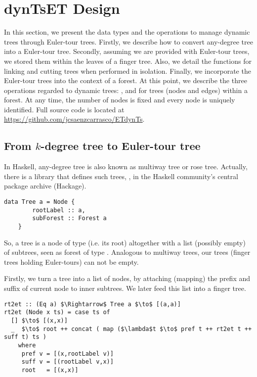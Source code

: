 \section{dynTsET Design}
\label{sec:TechDes}  


In this section, we present the data types and the operations to manage dynamic trees through Euler-tour trees. Firstly, we describe how to convert any-degree tree into a Euler-tour tree. Secondly, assuming we are provided with Euler-tour trees, we stored them within the leaves of a finger tree. Also, we detail the functions for linking and cutting trees when performed in isolation. Finally, we incorporate the Euler-tour trees into the context of a forest. At this point, we describe the three operations regarded to dynamic trees: \connected, \link and \cut for trees (nodes and edges) within a forest. At any time, the number of nodes is fixed and every node is uniquely identified. Full source code is located at \url{https://github.com/jcsaenzcarrasco/ETdynTs}.


\subsection{From $k$-degree tree to Euler-tour tree}

In Haskell, any-degree tree is also known as multiway tree or rose tree. Actually, there is a library that defines such trees, , in the Haskell community's central package archive (Hackage).

\begin{lstlisting}
data Tree a = Node {
        rootLabel :: a,         
        subForest :: Forest a   
    }
\end{lstlisting}

So, a tree is a node of type  (i.e. its root) altogether with a list (possibly empty) of subtrees, seen as forest of type . Analogous to multiway trees, our trees (finger trees holding Euler-tours) can not be empty. 

Firstly, we turn a tree into a list of nodes, by attaching (mapping) the prefix and suffix of current node to inner subtrees. We later feed this list into a finger tree. 

\begin{lstlisting}[mathescape] 
rt2et :: (Eq a) $\Rightarrow$ Tree a $\to$ [(a,a)] 
rt2et (Node x ts) = case ts of
  [] $\to$ [(x,x)]
  _  $\to$ root ++ concat ( map ($\lambda$t $\to$ pref t ++ rt2et t ++ suff t) ts )   
    where
     pref v = [(x,rootLabel v)]
     suff v = [(rootLabel v,x)]
     root   = [(x,x)] 
\end{lstlisting} 

